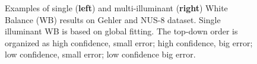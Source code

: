 \documentclass[10pt,twocolumn,letterpaper]{article}
\begin{document}
\begin{figure}
\begin{center}
\end{center}
\caption{Examples of single (\textbf{left}) and multi-illuminant (\textbf{right}) White Balance (WB) results on Gehler and NUS-8 dataset.
        Single illuminant WB is based on global fitting.
        The top-down order is organized as high confidence, small error;
        high confidence, big error; low confidence, small error; low confidence big error.}
\label{fig:all_results_0}
\end{figure}
\end{document}

